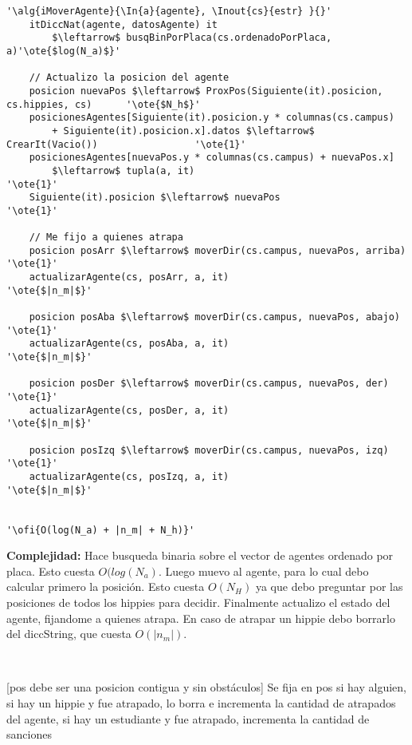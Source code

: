 \begin{lstlisting}[mathescape]
'\alg{iMoverAgente}{\In{a}{agente}, \Inout{cs}{estr} }{}'
	itDiccNat(agente, datosAgente) it
		$\leftarrow$ busqBinPorPlaca(cs.ordenadoPorPlaca, a)'\ote{$log(N_a)$}'

	// Actualizo la posicion del agente
	posicion nuevaPos $\leftarrow$ ProxPos(Siguiente(it).posicion, cs.hippies, cs)		'\ote{$N_h$}'
	posicionesAgentes[Siguiente(it).posicion.y * columnas(cs.campus)
		+ Siguiente(it).posicion.x].datos $\leftarrow$ CrearIt(Vacio())					'\ote{1}'
	posicionesAgentes[nuevaPos.y * columnas(cs.campus) + nuevaPos.x]
		$\leftarrow$ tupla(a, it)												'\ote{1}'
	Siguiente(it).posicion $\leftarrow$ nuevaPos										'\ote{1}'

	// Me fijo a quienes atrapa
	posicion posArr $\leftarrow$ moverDir(cs.campus, nuevaPos, arriba)			'\ote{1}'
	actualizarAgente(cs, posArr, a, it) 										'\ote{$|n_m|$}'

	posicion posAba $\leftarrow$ moverDir(cs.campus, nuevaPos, abajo)			'\ote{1}'
	actualizarAgente(cs, posAba, a, it) 										'\ote{$|n_m|$}'

	posicion posDer $\leftarrow$ moverDir(cs.campus, nuevaPos, der)				'\ote{1}'
	actualizarAgente(cs, posDer, a, it) 										'\ote{$|n_m|$}'

	posicion posIzq $\leftarrow$ moverDir(cs.campus, nuevaPos, izq)				'\ote{1}'
	actualizarAgente(cs, posIzq, a, it) 										'\ote{$|n_m|$}'


'\ofi{O(log(N_a) + |n_m| + N_h)}'
\end{lstlisting}

\textbf{Complejidad:} Hace busqueda binaria sobre el vector de agentes ordenado por placa. Esto cuesta $O(log( N_a)$. Luego muevo al agente, para lo cual debo calcular primero la posición. Esto cuesta $O(N_H)$ ya que debo preguntar por las posiciones de todos los hippies para decidir. Finalmente actualizo el estado del agente, fijandome a quienes atrapa. En caso de atrapar un hippie debo borrarlo del diccString, que cuesta $O(|n_m|)$.

~


[pos debe ser una posicion contigua y sin obstáculos]
{Se fija en pos si hay alguien, si hay un hippie y fue atrapado, lo borra e incrementa la cantidad de atrapados del agente, si hay un estudiante y fue atrapado, incrementa la cantidad de sanciones}


